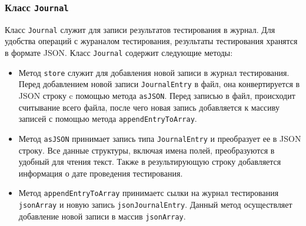 \subsubsection{Класс \texttt{Journal}}
Класс \texttt{Journal} служит для записи результатов тестирования в журнал. Для удобства операций с жураналом
тестирования, результаты тестирования хранятся в формате JSON. Класс \texttt{Journal} содержит следующие методы:
\begin{itemize}
	\item Метод \texttt{store} служит для добавления новой записи в журнал тестирования. Перед добавлением новой
		записи \texttt{JournalEntry} в файл, она конвертируется в JSON строку c помощью метода \texttt{asJSON}.
		Перед записью в файл, происходит считывание всего файла, после чего новая запись добавляется к массиву
		записей с помощью метода \texttt{appendEntryToArray}.

	\item Метод \texttt{asJSON} принимает запись типа \texttt{JournalEntry} и преобразует ее в JSON строку.
		Все данные структуры, включая имена полей, преобразуются в удобный для чтения текст. Также в
		результирующую строку добавляется информация о дате проведения тестирования.

	\item Метод \texttt{appendEntryToArray} принимаетс сылки на журнал тестирования \texttt{jsonArray} и новую
		запись \texttt{jsonJournalEntry}. Данный метод осуществляет добавление новой записи в массив
		\texttt{jsonArray}.
\end{itemize}

